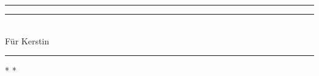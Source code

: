 \newpage

\centering %
\vspace*{\baselineskip} %

\rule{\textwidth}{1.6pt}\vspace*{-\baselineskip}\vspace*{2pt} %
\rule{\textwidth}{0.4pt}\\[\baselineskip] %

{\LARGE Für Kerstin}\\[\baselineskip]

\rule{\textwidth}{0.4pt}\vspace*{-\baselineskip}\vspace{3.2pt} %


\vspace*{25\baselineskip} %


\vfill %

{\scshape * * *}\par %
\newpage
